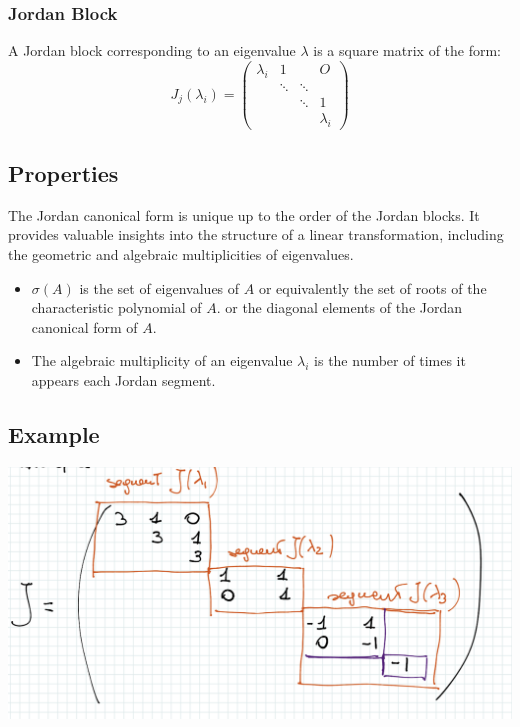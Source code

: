 \subsubsection{Jordan Block}
A Jordan block corresponding to an eigenvalue $\lambda$ is a square matrix of the form:
\begin{equation}
J_j(\lambda_i) = 
\begin{pmatrix}
    \lambda_i & 1 & & O \\
    & \ddots & \ddots & \\
    & & \ddots & 1 \\
    & & & \lambda_i
    \end{pmatrix}
\end{equation}

\subsection{Properties}
The Jordan canonical form is unique up to the order of the Jordan blocks.
It provides valuable insights into the structure of a linear transformation,
including the geometric and algebraic multiplicities of eigenvalues.

\begin{itemize}
    \item $\sigma(A)$ is the set of eigenvalues of $A$ or equivalently
    the set of roots of the characteristic polynomial of $A$.
    or the diagonal elements of the Jordan canonical form of $A$.
    \item The algebraic multiplicity of an eigenvalue $\lambda_i$ is the number of times it appears each Jordan segment.    
\end{itemize}

\subsection{Example}
\begin{center}
\includegraphics[width=\textwidth,height=\textheight,keepaspectratio]{images/jordan.png}
\end{center}

